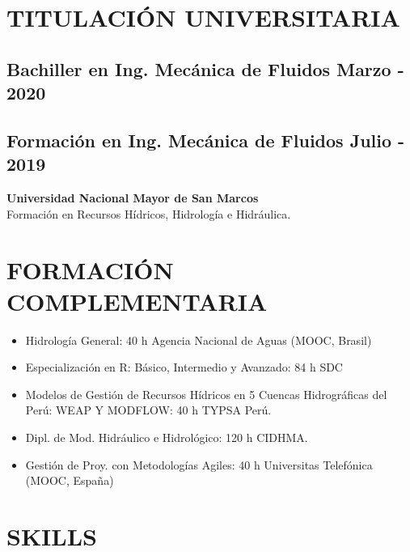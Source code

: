 \documentclass[
  10,
]{article}
\author{}
\date{\vspace{-2.5em}}
\providecommand{\tightlist}{%
  \setlength{\itemsep}{0pt}\setlength{\parskip}{0pt}}
\begin{document}
\hypertarget{titulaciuxf3n-universitaria}{%
\section{TITULACIÓN UNIVERSITARIA}\label{titulaciuxf3n-universitaria}}

\hypertarget{bachiller-en-ing.-mecuxe1nica-de-fluidos-marzo---2020}{%
\subsection{Bachiller en Ing. Mecánica de Fluidos \textbar{} Marzo -
2020}\label{bachiller-en-ing.-mecuxe1nica-de-fluidos-marzo---2020}}

\hypertarget{formaciuxf3n-en-ing.-mecuxe1nica-de-fluidos-julio---2019}{%
\subsection{Formación en Ing. Mecánica de Fluidos \textbar{} Julio -
2019}\label{formaciuxf3n-en-ing.-mecuxe1nica-de-fluidos-julio---2019}}

\textbf{Universidad Nacional Mayor de San Marcos}\\
Formación en Recursos Hídricos, Hidrología e Hidráulica.

\hypertarget{formaciuxf3n-complementaria}{%
\section{FORMACIÓN COMPLEMENTARIA}\label{formaciuxf3n-complementaria}}

\begin{itemize}
\tightlist
\item
  Hidrología General: 40 h \textbar{} Agencia Nacional de Aguas (MOOC,
  Brasil)
\item
  Especialización en R: Básico, Intermedio y Avanzado: 84 h \textbar{}
  SDC
\item
  Modelos de Gestión de Recursos Hídricos en 5 Cuencas Hidrográficas del
  Perú: WEAP Y MODFLOW: 40 h \textbar{} TYPSA Perú.
\item
  Dipl. de Mod. Hidráulico e Hidrológico: 120 h \textbar{} CIDHMA.
\item
  Gestión de Proy. con Metodologías Agiles: 40 h \textbar{} Universitas
  Telefónica (MOOC, España)
\end{itemize}

\hypertarget{skills}{%
\section{SKILLS}\label{skills}}
\end{document}
